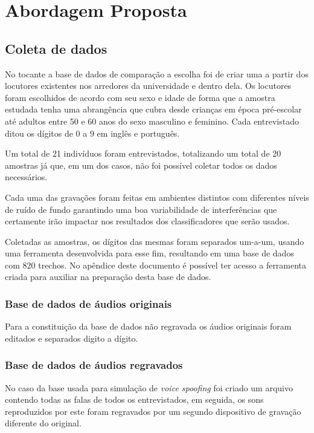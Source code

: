 \chapter{Abordagem Proposta} \label{chap:propApproach}
	\begin{myenv}{1.5}
		\section{Coleta de dados}
			\par No tocante a base de dados de comparação a escolha foi de criar uma a partir dos locutores existentes nos arredores da universidade e dentro dela. Os locutores foram escolhidos de acordo com seu sexo e idade de forma que a amostra estudada tenha uma abrangência que cubra desde crianças em época pré-escolar até adultos entre 50 e 60 anos do sexo masculino e feminino. Cada entrevistado ditou os dígitos de 0 a 9 em inglês e português.
			
			\par Um total de 21 indivíduos foram entrevistados, totalizando um total de 20 amostras já que, em um dos casos, não foi possível coletar todos os dados necessários.
			
			\par Cada uma das gravações foram feitas em ambientes distintos com diferentes níveis de ruído de fundo garantindo uma boa variabilidade de interferências que certamente irão impactar nos resultados dos classificadores que serão usados.
			
			\par Coletadas as amostras, os dígitos das mesmas foram separados um-a-um, usando uma ferramenta desenvolvida para esse fim, resultando em uma base de dados com 820 trechos. No apêndice deste documento é possível ter acesso a ferramenta criada para auxiliar na preparação desta base de dados.
			
			\subsection{Base de dados de áudios originais}
				\par Para a constituição da base de dados não regravada os áudios originais foram editados e separados digito a dígito.
	
			\subsection{Base de dados de áudios regravados}
				\par No caso da base usada para simulação de \textit{voice spoofing} foi criado um arquivo contendo todas as falas de todos os entrevistados, em seguida, os sons reproduzidos por este foram regravados por um segundo dispositivo de gravação diferente do original.


\end{myenv}
